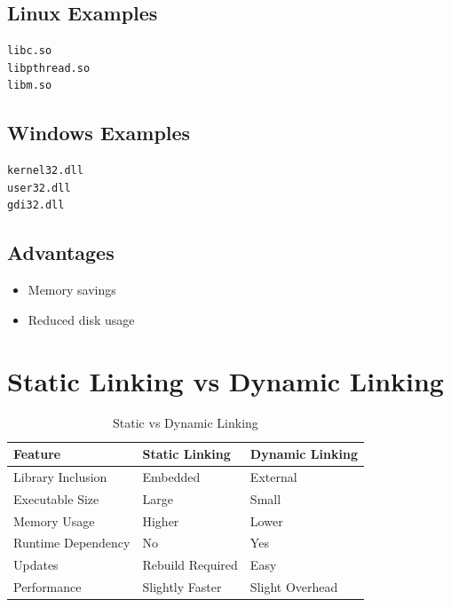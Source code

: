 \subsection{Linux Examples}

\begin{verbatim}
libc.so
libpthread.so
libm.so
\end{verbatim}

\subsection{Windows Examples}

\begin{verbatim}
kernel32.dll
user32.dll
gdi32.dll
\end{verbatim}

\subsection{Advantages}

\begin{itemize}
\item Memory savings
\item Reduced disk usage
\end{itemize}

\section{Static Linking vs Dynamic Linking}

\begin{table}[H]
\centering
\small
\begin{tabular}{|p{4cm}|p{5cm}|p{5cm}|}
\hline
Feature & Static Linking & Dynamic Linking \\
\hline
Library Inclusion & Embedded & External \\
\hline
Executable Size & Large & Small \\
\hline
Memory Usage & Higher & Lower \\
\hline
Runtime Dependency & No & Yes \\
\hline
Updates & Rebuild Required & Easy \\
\hline
Performance & Slightly Faster & Slight Overhead \\
\hline
\end{tabular}
\caption{Static vs Dynamic Linking}
\end{table}

